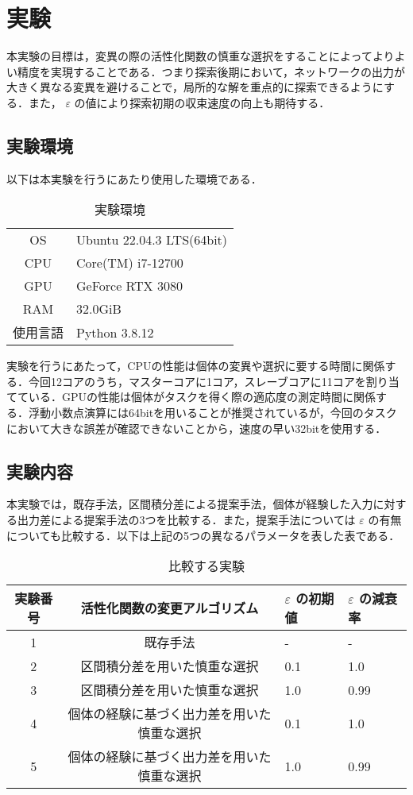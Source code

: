 \section{実験}
本実験の目標は，変異の際の活性化関数の慎重な選択をすることによってよりよい精度を実現することである．つまり探索後期において，ネットワークの出力が大きく異なる変異を避けることで，局所的な解を重点的に探索できるようにする．また， $ \varepsilon $ の値により探索初期の収束速度の向上も期待する．

\subsection{実験環境}
以下は本実験を行うにあたり使用した環境である．

\begin{table}[h]
    \caption{実験環境}
    \centering
    \begin{tabular}{cl}
        \hline
        OS & Ubuntu 22.04.3 LTS(64bit) \\
        CPU & Core(TM) i7-12700 \\
        GPU & GeForce RTX 3080 \\
        RAM & 32.0GiB \\
        使用言語 & Python 3.8.12 \\
        \hline
    \end{tabular}
\end{table}

実験を行うにあたって，CPUの性能は個体の変異や選択に要する時間に関係する．今回12コアのうち，マスターコアに1コア，スレーブコアに11コアを割り当てている．GPUの性能は個体がタスクを得く際の適応度の測定時間に関係する．浮動小数点演算には64bitを用いることが推奨されているが，今回のタスクにおいて大きな誤差が確認できないことから，速度の早い32bitを使用する．

\subsection{実験内容}
本実験では，既存手法，区間積分差による提案手法，個体が経験した入力に対する出力差による提案手法の3つを比較する．また，提案手法については $ \varepsilon $ の有無についても比較する．以下は上記の5つの異なるパラメータを表した表である．

\begin{table}[h]
    \caption{比較する実験}
    \centering
    \begin{tabular}{ccll}
        \hline
        実験番号  & 活性化関数の変更アルゴリズム & $ \varepsilon $ の初期値 & $ \varepsilon $ の減衰率 \\
        \hline \hline
        1 & 既存手法 & - & - \\
        2 & 区間積分差を用いた慎重な選択 & 0.1 & 1.0 \\
        3 & 区間積分差を用いた慎重な選択 & 1.0 & 0.99 \\
        4 & 個体の経験に基づく出力差を用いた慎重な選択 & 0.1 & 1.0 \\
        5 & 個体の経験に基づく出力差を用いた慎重な選択 & 1.0 & 0.99 \\
        \hline
    \end{tabular}
\end{table}

